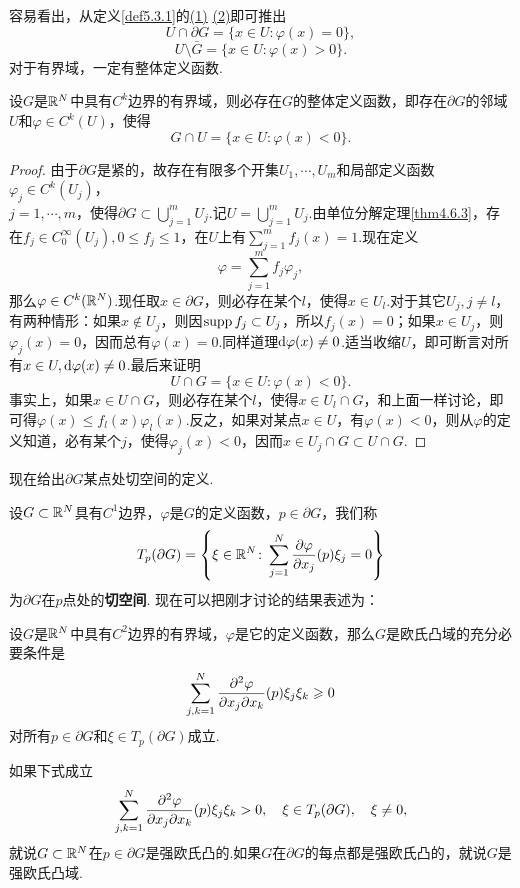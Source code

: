 容易看出，从定义\ref{def5.3.1}的\hyperlink{5.3.1}{(1)} \hyperlink{5.3.1}{(2)}即可推出
\[U\cap\partial G=\{x\in U\colon\varphi(x)=0\},\]
\[U\setminus\bar{G}=\{x\in U\colon\varphi(x)>0\}.\]
对于有界域，一定有整体定义函数.
\begin{prop}\label{prop5.3.2}
	设$G$是$\mathbb R^N$中具有$C^k$边界的有界域，则必存在$G$的整体定义函数，即存在$\partial G$的邻域$U$和$\varphi\in C^k(U)$，使得
	\[G\cap U=\{x\in U\colon\varphi(x)<0\}.\]
\end{prop}
\begin{proof}
	由于$\partial G$是紧的，故存在有限多个开集$U_1,\cdots,U_m$和局部定义函数$\varphi_j\in C^k(U_j)$，\\
	$j=1,\cdots,m$，使得$\partial G\subset\bigcup\limits_{j=1}^m U_j$.记$U=\bigcup\limits_{j=1}^m U_j$.由单位分解定理\ref{thm4.6.3}，存在$f_j\in C_0^\infty(U_j),0\le f_j\le1$，在$U$上有$\sum\limits_{j=1}^m f_j(x)=1$.现在定义
	\[\varphi=\sum_{j=1}^{m}f_j\varphi_j,\]
	那么$\varphi\in C^k(\mathbb R^N)$.现任取$x\in\partial G$，则必存在某个$l$，使得$x\in U_l$.对于其它$U_j,j\neq l$，有两种情形：如果$x\notin U_j$，则因$\operatorname{supp} f_j\subset U_j$，所以$f_j(x)=0$；如果$x\in U_j$，则$\varphi_j(x)=0$，因而总有$\varphi(x)=0$.同样道理$\mathop{}\!\mathrm{d}\varphi(x)\neq0$.适当收缩$U$，即可断言对所有$x\in U,\mathop{}\!\mathrm{d}\varphi(x)\neq0$.最后来证明
	\[U\cap G=\{x\in U\colon\varphi(x)<0\}.\]
	事实上，如果$x\in U\cap G$，则必存在某个$l$，使得$x\in U_l\cap G$，和上面一样讨论，即可得$\varphi(x)\le f_l(x)\varphi_l(x)$.反之，如果对某点$x\in U$，有$\varphi(x)<0$，则从$\varphi$的定义知道，必有某个$j$，使得$\varphi_j(x)<0$，因而$x\in U_j\cap G\subset U\cap G$.
\end{proof}
现在给出$\partial G$某点处切空间的定义.

设$G\subset\mathbb R^N$具有$C^1$边界，$\varphi$是$G$的定义函数，$p\in\partial G$，我们称
\[T_p(\partial G)=\left\{\xi\in\mathbb R^N\colon\sum_{j=1}^N \frac{\partial \varphi}{\partial x_j}(p)\xi_j=0\right\}\]
为$\partial G$在$p$点处的\textbf{切空间}.
现在可以把刚才讨论的结果表述为：

设$G$是$\mathbb R^N$中具有$C^2$边界的有界域，$\varphi$是它的定义函数，那么$G$是欧氏凸域的充分必要条件是
\begin{equation}\label{eq5.3.3}
	\sum_{j,k=1}^{N}\frac{\partial^2 \varphi}{\partial x_j\partial x_k}(p)\xi_j\xi_k\geqslant0
\end{equation}
对所有$p\in\partial G$和$\xi\in T_p(\partial G)$成立.

如果下式成立
\[\sum_{j,k=1}^{N}\frac{\partial^2 \varphi}{\partial x_j\partial x_k}(p)\xi_j\xi_k>0,\quad \xi\in T_p(\partial G),\quad \xi\neq0,\]
就说$G\subset\mathbb R^N$在$p\in\partial G$是强欧氏凸的.如果$G$在$\partial G$的每点都是强欧氏凸的，就说$G$是强欧氏凸域.
